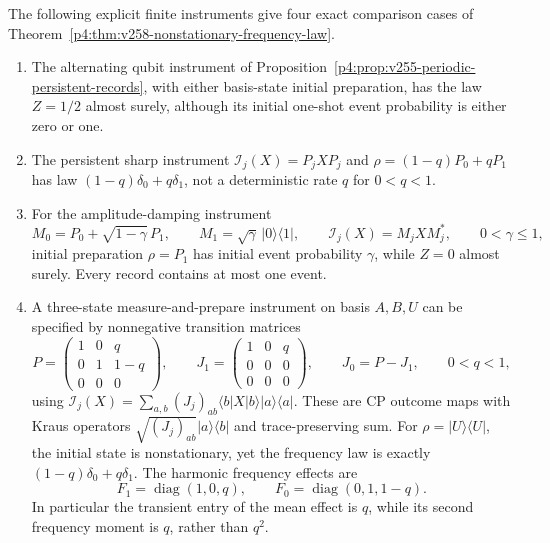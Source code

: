 \documentclass[12pt,a4paper]{article}
\begin{document}
\begin{proposition}
\label{p4:prop:v258-frequency-law-diagnostics}
The following explicit finite instruments give four exact comparison cases of
Theorem~\ref{p4:thm:v258-nonstationary-frequency-law}.
\begin{enumerate}
\item The alternating qubit instrument of
Proposition~\ref{p4:prop:v255-periodic-persistent-records}, with either
basis-state initial preparation, has the law $Z=1/2$ almost surely,
although its initial one-shot event probability is either zero or one.
\item The persistent sharp instrument $\mathcal I_j(X)=P_jXP_j$ and
$\rho=(1-q)P_0+qP_1$ has law
$(1-q)\delta_0+q\delta_1$, not a deterministic rate $q$ for $0<q<1$.
\item For the amplitude-damping instrument
\[
 M_0=P_0+\sqrt{1-\gamma}\,P_1,\qquad
 M_1=\sqrt\gamma\,|0\rangle\langle1|,\qquad
 \mathcal I_j(X)=M_jXM_j^*,\qquad 0<\gamma\le1,
\]
initial preparation $\rho=P_1$ has initial event probability $\gamma$,
while $Z=0$ almost surely. Every record contains at most one event.
\item A three-state measure-and-prepare instrument on basis $A,B,U$
can be specified by nonnegative transition matrices
\[
 P=\begin{pmatrix}1&0&q\\0&1&1-q\\0&0&0\end{pmatrix},\qquad
 J_1=\begin{pmatrix}1&0&q\\0&0&0\\0&0&0\end{pmatrix},\qquad
 J_0=P-J_1,
 \qquad 0<q<1,
\]
using
$\mathcal I_j(X)=\sum_{a,b}(J_j)_{ab}
 \langle b|X|b\rangle|a\rangle\langle a|$.
These are CP outcome maps with Kraus operators
$\sqrt{(J_j)_{ab}}|a\rangle\langle b|$ and trace-preserving sum.
For $\rho=|U\rangle\langle U|$, the initial state is nonstationary,
yet the frequency law is exactly
$(1-q)\delta_0+q\delta_1$. The harmonic frequency effects are
\[
 F_1=\operatorname{diag}(1,0,q),\qquad
 F_0=\operatorname{diag}(0,1,1-q).
\]
In particular the transient entry of the mean effect is $q$, while its
second frequency moment is $q$, rather than $q^2$.
\end{enumerate}
\end{proposition}
\end{document}
